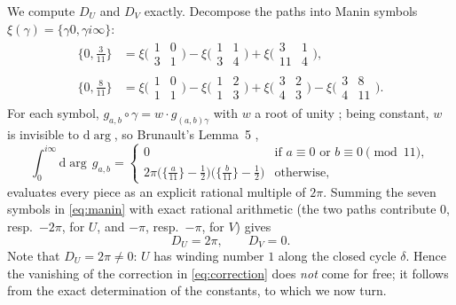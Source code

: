 We compute $D_U$ and $D_V$ exactly. Decompose the paths into Manin symbols
$\xi(\gamma) = \{\gamma 0, \gamma i\infty\}$:
\begin{equation}\label{eq:manin}
\begin{aligned}
  \{0,\tfrac{3}{11}\} &=
    \xi\bigl(\begin{smallmatrix}1&0\\3&1\end{smallmatrix}\bigr)
  - \xi\bigl(\begin{smallmatrix}1&1\\3&4\end{smallmatrix}\bigr)
  + \xi\bigl(\begin{smallmatrix}3&1\\11&4\end{smallmatrix}\bigr),\\
  \{0,\tfrac{8}{11}\} &=
    \xi\bigl(\begin{smallmatrix}1&0\\1&1\end{smallmatrix}\bigr)
  - \xi\bigl(\begin{smallmatrix}1&2\\1&3\end{smallmatrix}\bigr)
  + \xi\bigl(\begin{smallmatrix}3&2\\4&3\end{smallmatrix}\bigr)
  - \xi\bigl(\begin{smallmatrix}3&8\\4&11\end{smallmatrix}\bigr).
\end{aligned}
\end{equation}
For each symbol, $g_{a,b}\circ\gamma = w\cdot g_{(a,b)\gamma}$ with $w$ a root
of unity \cite[(4)]{Brunault}; being constant, $w$ is invisible to
$\mathrm{d}\!\arg$, so Brunault's Lemma~5 \cite{Brunault},
\begin{equation}\label{eq:lemma5}
  \int_0^{i\infty} \mathrm{d}\!\arg\, g_{a,b} =
  \begin{cases}
    0 & \text{if } a \equiv 0 \text{ or } b \equiv 0 \pmod{11},\\[2mm]
    2\pi\bigl(\{\tfrac{a}{11}\}-\tfrac12\bigr)
        \bigl(\{\tfrac{b}{11}\}-\tfrac12\bigr)
      & \text{otherwise},
  \end{cases}
\end{equation}
evaluates every piece as an explicit rational multiple of $2\pi$. Summing the
seven symbols in \eqref{eq:manin} with exact rational arithmetic (the two paths
contribute $0$, resp.\ $-2\pi$, for $U$, and $-\pi$, resp.\ $-\pi$, for $V$)
gives
\begin{equation}\label{eq:DUDV}
  D_U = 2\pi, \qquad D_V = 0 .
\end{equation}
Note that $D_U = 2\pi \neq 0$: $U$ has winding number $1$ along the closed
cycle $\delta$. Hence the vanishing of the correction in \eqref{eq:correction}
does \emph{not} come for free; it follows from the exact determination of the
constants, to which we now turn.


